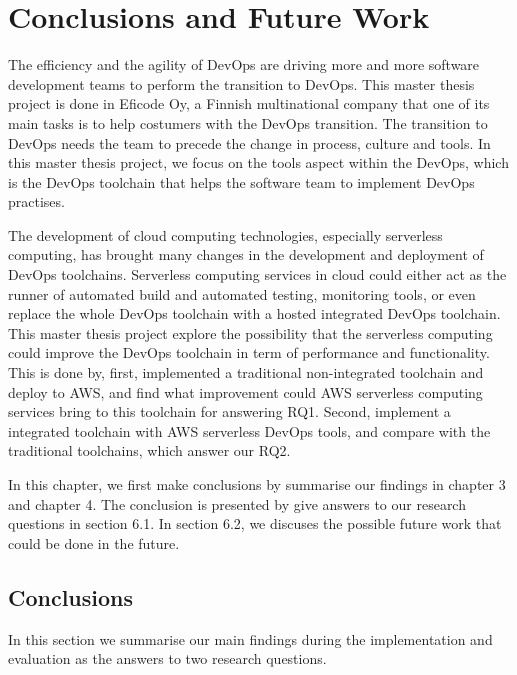 \chapter{Conclusions and Future Work}
\label{chp:conclusionsandfuturework}
The efficiency and the agility of DevOps are driving more and more software development teams to perform the transition to DevOps. This master thesis project is done in Eficode Oy, a Finnish multinational company that one of its main tasks is to help costumers with the DevOps transition. The transition to DevOps needs the team to precede the change in process, culture and tools. In this master thesis project, we focus on the tools aspect within the DevOps, which is the DevOps toolchain that helps the software team to implement DevOps practises. 

The development of cloud computing technologies, especially serverless computing, has brought many changes in the development and deployment of DevOps toolchains. Serverless computing services in cloud could either act as the runner of automated build and automated testing, monitoring tools, or even replace the whole DevOps toolchain with a hosted integrated DevOps toolchain. This master thesis project explore the possibility that the serverless computing could improve the DevOps toolchain in term of performance and functionality. This is done by, first, implemented a traditional non-integrated toolchain and deploy to AWS, and find what improvement could AWS serverless computing services bring to this toolchain for answering RQ1. Second, implement a integrated toolchain with AWS serverless DevOps tools, and compare with the traditional toolchains, which answer our RQ2. 

In this chapter, we first make conclusions by summarise our findings in chapter 3 and chapter 4. The conclusion is presented by give answers to our research questions in section 6.1. In section 6.2, we discuses the possible future work that could be done in the future.
\section{Conclusions}
In this section we summarise our main findings during the implementation and evaluation as the answers to two research questions.

